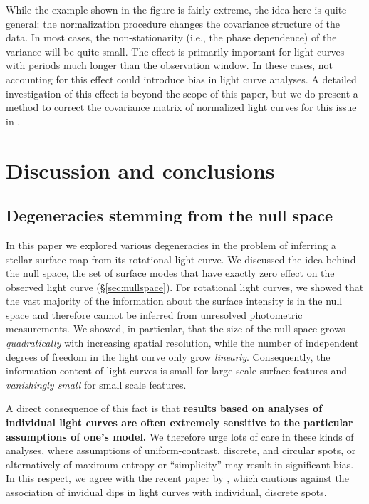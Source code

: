 \documentclass[modern,linenumbers]{aastex62}
\begin{document}
While the example shown in the figure is fairly extreme, the idea here
is quite general: the normalization procedure changes the covariance
structure of the data. In most cases, the non-stationarity (i.e., the
phase dependence) of the variance will be quite small. The effect is primarily
important for light curves with periods much longer than
the observation window. In these cases, not accounting for this effect
could introduce bias in light curve analyses. A detailed investigation of
this effect is beyond the scope of this paper, but we do present a
method to correct the covariance matrix of normalized light curves for
this issue in .

\section{Discussion and conclusions}

\subsection{Degeneracies stemming from the null space}

In this paper we explored various degeneracies in the problem of
inferring a stellar surface map from its rotational light curve.
We discussed the idea behind the null space, the set of surface modes that
have exactly zero effect on the observed light curve (\S\ref{sec:nullspace}).
For rotational light curves, we showed that the vast majority of the information
about the surface intensity is in the null space and therefore cannot
be inferred from unresolved photometric measurements. We showed, in particular,
that the size of the null space grows \emph{quadratically} with increasing spatial
resolution, while the number of independent degrees of freedom in the light curve
only grow \emph{linearly}. Consequently, the information content of light
curves is small for large scale surface features and \emph{vanishingly small}
for small scale features.

A direct consequence of this fact is that \textbf{results based on analyses
    of individual light curves are often extremely sensitive to
    the particular assumptions of one's model.} We therefore urge lots of care
in these kinds of analyses, where assumptions of uniform-contrast, discrete, and
circular spots, or alternatively of maximum entropy or ``simplicity'' may
result in significant bias. In this respect, we agree with the recent
paper by \citet{Basri2020}, which cautions against the association of
invidual dips in light curves with individual, discrete spots.
\end{document}
